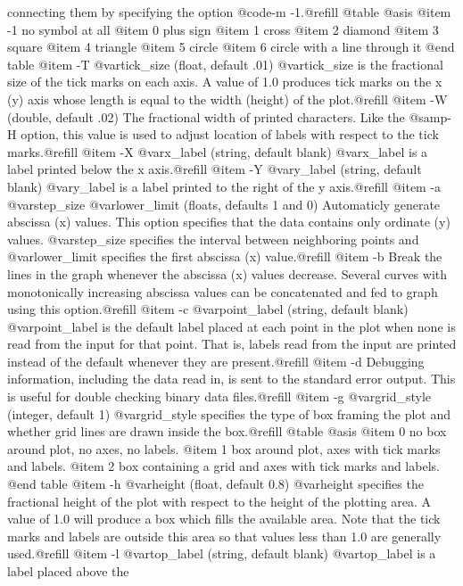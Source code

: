 connecting them by specifying the option @code{-m -1}.@refill
@table @asis
@item -1 no symbol at all
@item 0 plus sign
@item 1 cross
@item 2 diamond
@item 3 square
@item 4 triangle
@item 5 circle
@item 6 circle with a line through it
@end table
@item -T @var{tick_size}
(float, default .01) @var{tick_size} is the fractional size of the tick
marks on each axis.  A value of 1.0 produces tick marks on the x (y)
axis whose length is equal to the width (height) of the plot.@refill
@item -W
(double, default .02) The fractional width of printed characters.  Like
the @samp{-H} option, this value is used to adjust location of labels
with respect to the tick marks.@refill
@item -X @var{x_label}
(string, default blank) @var{x_label} is a label printed below the x
axis.@refill
@item -Y @var{y_label}
(string, default blank) @var{y_label} is a label printed to the right of
the y axis.@refill
@item -a @var{step_size} @var{lower_limit}
(floats, defaults 1 and 0) Automaticly generate abscissa (x) values.
This option specifies that the data contains only ordinate (y) values.
@var{step_size} specifies the interval between neighboring points and
@var{lower_limit} specifies the first abscissa (x) value.@refill
@item -b
Break the lines in the graph whenever the abscissa (x) values
decrease.  Several curves with monotonically increasing abscissa
values can be concatenated and fed to graph using this option.@refill
@item -c @var{point_label}
(string, default blank) @var{point_label} is the default label placed at
each point in the plot when none is read from the input for that point.
That is, labels read from the input are printed instead of the default
whenever they are present.@refill
@item -d
Debugging information, including the data read in, is sent to the
standard error output.  This is useful for double checking binary data
files.@refill
@item -g @var{grid_style}
(integer, default 1) @var{grid_style} specifies the type of box framing
the plot and whether grid lines are drawn inside the box.@refill
@table @asis
@item 0 no box around plot, no axes, no labels.
@item 1 box around plot, axes with tick marks and labels.
@item 2 box containing a grid and axes with tick marks and labels.
@end table
@item -h @var{height}
(float, default 0.8) @var{height} specifies the fractional height of the
plot with respect to the height of the plotting area.  A value of 1.0
will produce a box which fills the available area.  Note that the tick
marks and labels are outside this area so that values less than 1.0 are
generally used.@refill
@item -l @var{top_label}
(string, default blank) @var{top_label} is a label placed above the
